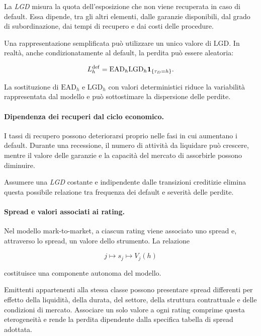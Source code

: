 La \emph{LGD} misura la quota dell'esposizione che non viene recuperata
in caso di default. Essa dipende, tra gli altri elementi, dalle
garanzie disponibili, dal grado di subordinazione, dai tempi di
recupero e dai costi delle procedure.

Una rappresentazione semplificata pu\`{o} utilizzare un unico valore di
$\mathrm{LGD}$. In realt\`{a}, anche condizionatamente al default, la
perdita pu\`{o} essere aleatoria:

\[
L_h^{\mathrm{def}}
=
\mathrm{EAD}_h
\mathrm{LGD}_h
\mathbf{1}_{\{\tau_D=h\}}.
\]

La sostituzione di $\mathrm{EAD}_h$ e $\mathrm{LGD}_h$ con valori
deterministici riduce la variabilit\`{a} rappresentata dal modello e
pu\`{o} sottostimare la dispersione delle perdite.

\paragraph{Dipendenza dei recuperi dal ciclo economico.}

I tassi di recupero possono deteriorarsi proprio nelle fasi in cui
aumentano i default. Durante una recessione, il numero di attivit\`{a}
da liquidare pu\`{o} crescere, mentre il valore delle garanzie e la
capacit\`{a} del mercato di assorbirle possono diminuire.

Assumere una \emph{LGD} costante e indipendente dalle transizioni
creditizie elimina questa possibile relazione tra frequenza dei
default e severit\`{a} delle perdite.

\paragraph{Spread e valori associati ai rating.}

Nel modello mark-to-market, a ciascun rating viene associato uno spread
e, attraverso lo spread, un valore dello strumento. La relazione

\[
j
\longmapsto
s_j
\longmapsto
V_j(h)
\]

costituisce una componente autonoma del modello.

Emittenti appartenenti alla stessa classe possono presentare spread
differenti per effetto della liquidit\`{a}, della durata, del settore,
della struttura contrattuale e delle condizioni di mercato. Associare
un solo valore a ogni rating comprime questa eterogeneit\`{a} e rende
la perdita dipendente dalla specifica tabella di spread adottata.

